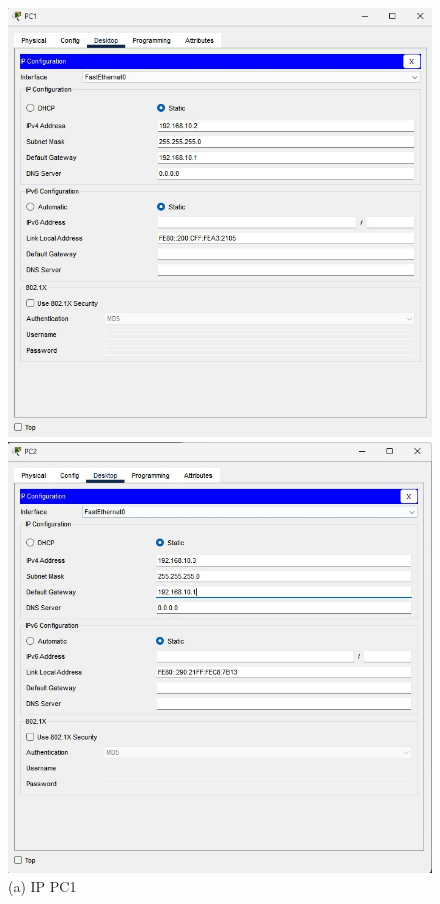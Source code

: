 \begin{enumerate}
    \begin{figure}[H]
        \centering
        \begin{minipage}{0.32\textwidth}
            \centering
            \includegraphics[width=\textwidth]{img4/IPCPC1.jpeg}
            \caption*{(a) IP PC1}
        \end{minipage}\hfill
        \begin{minipage}{0.32\textwidth}
            \centering
            \includegraphics[width=\textwidth]{img4/IPCPC2.jpeg}

\end{minipage}
\end{figure}
\end{enumerate}
